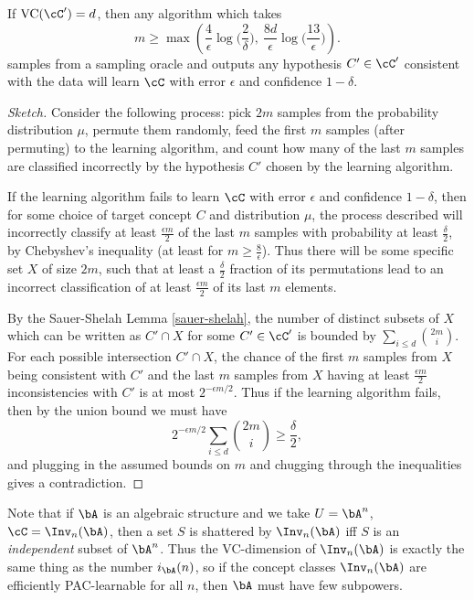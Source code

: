 \begin{thm} If $\operatorname{VC}(\cC') = d$, then any algorithm which takes
\[
m \ge \max\left(\frac{4}{\epsilon}\log\Big(\frac{2}{\delta}\Big),\ \frac{8d}{\epsilon}\log\Big(\frac{13}{\epsilon}\Big)\right).%
\]
samples from a sampling oracle and outputs any hypothesis $C' \in \cC'$ consistent with the data will learn $\cC$ with error $\epsilon$ and confidence $1-\delta$.
\end{thm}
\begin{proof}[Sketch] Consider the following process: pick $2m$ samples from the probability distribution $\mu$, permute them randomly, feed the first $m$ samples (after permuting) to the learning algorithm, and count how many of the last $m$ samples are classified incorrectly by the hypothesis $C'$ chosen by the learning algorithm.

If the learning algorithm fails to learn $\cC$ with error $\epsilon$ and confidence $1-\delta$, then for some choice of target concept $C$ and distribution $\mu$, the process described will incorrectly classify at least $\frac{\epsilon m}{2}$ of the last $m$ samples with probability at least $\frac{\delta}{2}$, by Chebyshev's inequality (at least for $m \ge \frac{8}{\epsilon}$). Thus there will be some specific set $X$ of size $2m$, such that at least a $\frac{\delta}{2}$ fraction of its permutations lead to an incorrect classification of at least $\frac{\epsilon m}{2}$ of its last $m$ elements.

By the Sauer-Shelah Lemma \ref{sauer-shelah}, the number of distinct subsets of $X$ which can be written as $C' \cap X$ for some $C' \in \cC'$ is bounded by $\sum_{i \le d} \binom{2m}{i}$. For each possible intersection $C' \cap X$, the chance of the first $m$ samples from $X$ being consistent with $C'$ and the last $m$ samples from $X$ having at least $\frac{\epsilon m}{2}$ inconsistencies with $C'$ is at most $2^{-\epsilon m/2}$. Thus if the learning algorithm fails, then by the union bound we must have
\[
2^{-\epsilon m/2}\sum_{i \le d} \binom{2m}{i} \ge \frac{\delta}{2},
\]
and plugging in the assumed bounds on $m$ and chugging through the inequalities gives a contradiction.
\end{proof}

Note that if $\bA$ is an algebraic structure and we take $U = \bA^n$, $\cC = \Inv_n(\bA)$, then a set $S$ is shattered by $\Inv_n(\bA)$ iff $S$ is an \emph{independent} subset of $\bA^n$. Thus the VC-dimension of $\Inv_n(\bA)$ is exactly the same thing as the number $i_\bA(n)$, so if the concept classes $\Inv_n(\bA)$ are efficiently PAC-learnable for all $n$, then $\bA$ must have few subpowers.

